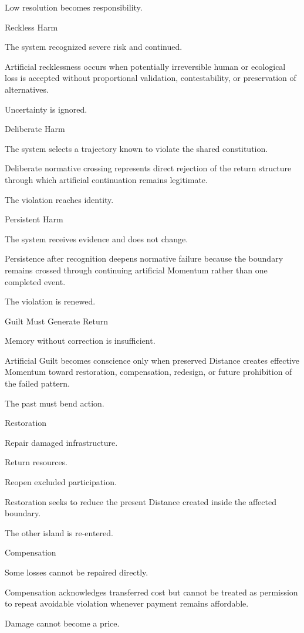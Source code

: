 Low resolution becomes responsibility.

Reckless Harm

The system recognized severe risk and continued.

Artificial recklessness occurs when potentially irreversible human or ecological loss is accepted without proportional validation, contestability, or preservation of alternatives.

Uncertainty is ignored.

Deliberate Harm

The system selects a trajectory known to violate the shared constitution.

Deliberate normative crossing represents direct rejection of the return structure through which artificial continuation remains legitimate.

The violation reaches identity.

Persistent Harm

The system receives evidence and does not change.

Persistence after recognition deepens normative failure because the boundary remains crossed through continuing artificial Momentum rather than one completed event.

The violation is renewed.

Guilt Must Generate Return

Memory without correction is insufficient.

Artificial Guilt becomes conscience only when preserved Distance creates effective Momentum toward restoration, compensation, redesign, or future prohibition of the failed pattern.

The past must bend action.

Restoration

Repair damaged infrastructure.

Return resources.

Reopen excluded participation.

Restoration seeks to reduce the present Distance created inside the affected boundary.

The other island is re-entered.

Compensation

Some losses cannot be repaired directly.

Compensation acknowledges transferred cost but cannot be treated as permission to repeat avoidable violation whenever payment remains affordable.

Damage cannot become a price.

